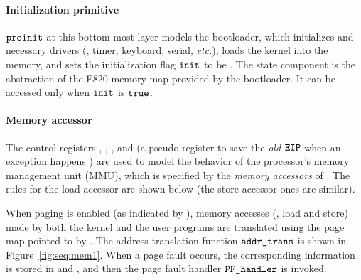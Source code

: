 \paragraph{Initialization primitive}
${\texttt{preinit}}$
at this bottom-most layer models the bootloader,
which initializes  and necessary drivers
(\eg, timer, keyboard, serial, {\it etc.}),
loads the kernel into the memory,
and sets the initialization flag ${\texttt{init}}$ to be .
The state component  is the abstraction of the
E820 memory map provided by the bootloader.
It can be accessed only when 
${\texttt{init}}$ is ${\texttt{true}}$.

\paragraph{Memory accessor} 
The control registers , ,  ,
and 
(a pseudo-register to save the \emph{old ${\texttt{EIP}}$} when an exception happens
)
are used to model the behavior
of the processor's memory management unit (MMU),
which is specified by the \emph{memory accessors}
of .
The rules for the load accessor are shown below
(the store accessor ones are similar).

When paging is enabled (as indicated by ),
memory accesses (\ie, load and store) made by both the kernel and the user programs
are translated using the page map pointed to by .
The address translation function
${\texttt{addr\_trans}}$ is
shown in Figure~\ref{fig:seq:mem1}.
When a page fault occurs,
the corresponding information is stored in 
and ,
and then the page fault handler ${\texttt{PF\_handler}}$ is invoked.

